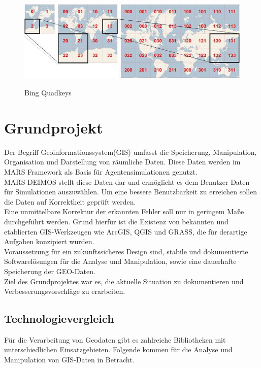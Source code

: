 \documentclass[10pt,conference,compsocconf]{IEEEtran}
\begin{document}
\begin{figure}[H]
	\centering
	\includegraphics[width=1\columnwidth]{img/bing_quads.png}\\
	\caption[]{Bing Quadkeys\cite{BingQuadkeys}}
	\label{img:bing_quads}
\end{figure}


\section{Grundprojekt}
Der Begriff Geoinformationssystem(GIS) umfasst die Speicherung, Manipulation, Organisation und Darstellung von räumliche Daten. Diese Daten werden im MARS Framework als Basis für Agentensimulationen genutzt.\\
MARS DEIMOS stellt diese Daten dar und ermöglicht es dem Benutzer Daten für Simulationen auszuwählen. Um eine bessere Benutzbarkeit zu erreichen sollen die Daten auf Korrektheit geprüft werden.\\
Eine unmittelbare Korrektur der erkannten Fehler soll nur in geringem Maße durchgeführt werden. Grund hierfür ist die Existenz von bekannten und etablierten GIS-Werkzeugen wie ArcGIS, QGIS und GRASS, die für derartige Aufgaben konzipiert wurden.\\
Voraussetzung für ein zukunftssicheres Design sind, stabile und dokumentierte Softwarelösungen für die Analyse und Manipulation, sowie eine dauerhafte Speicherung der GEO-Daten.\\
Ziel des Grundprojektes war es, die aktuelle Situation zu dokumentieren und Verbesserungsvorschläge zu erarbeiten.\\


\subsection{Technologievergleich}
Für die Verarbeitung von Geodaten gibt es zahlreiche Bibliotheken mit unterschiedlichen Einsatzgebieten. Folgende kommen für die Analyse und Manipulation von GIS-Daten in Betracht.\\
\end{document}

